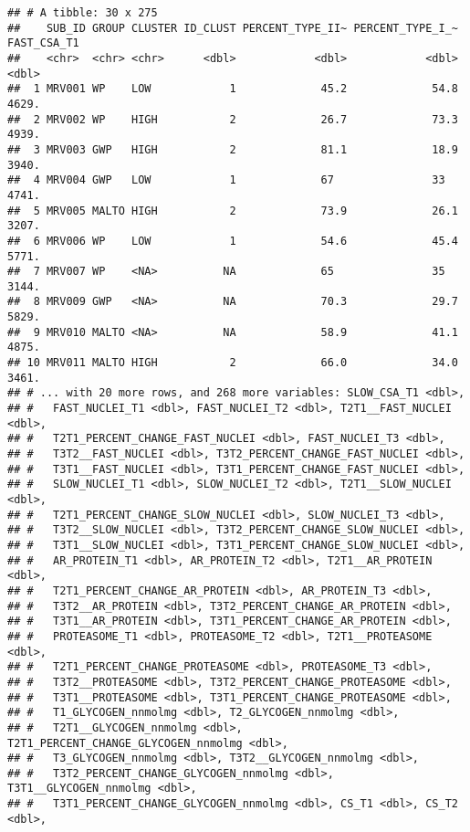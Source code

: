 \documentclass[
]{article}
\begin{document}
\begin{verbatim}
## # A tibble: 30 x 275
##    SUB_ID GROUP CLUSTER ID_CLUST PERCENT_TYPE_II~ PERCENT_TYPE_I_~ FAST_CSA_T1
##    <chr>  <chr> <chr>      <dbl>            <dbl>            <dbl>       <dbl>
##  1 MRV001 WP    LOW            1             45.2             54.8       4629.
##  2 MRV002 WP    HIGH           2             26.7             73.3       4939.
##  3 MRV003 GWP   HIGH           2             81.1             18.9       3940.
##  4 MRV004 GWP   LOW            1             67               33         4741.
##  5 MRV005 MALTO HIGH           2             73.9             26.1       3207.
##  6 MRV006 WP    LOW            1             54.6             45.4       5771.
##  7 MRV007 WP    <NA>          NA             65               35         3144.
##  8 MRV009 GWP   <NA>          NA             70.3             29.7       5829.
##  9 MRV010 MALTO <NA>          NA             58.9             41.1       4875.
## 10 MRV011 MALTO HIGH           2             66.0             34.0       3461.
## # ... with 20 more rows, and 268 more variables: SLOW_CSA_T1 <dbl>,
## #   FAST_NUCLEI_T1 <dbl>, FAST_NUCLEI_T2 <dbl>, T2T1__FAST_NUCLEI <dbl>,
## #   T2T1_PERCENT_CHANGE_FAST_NUCLEI <dbl>, FAST_NUCLEI_T3 <dbl>,
## #   T3T2__FAST_NUCLEI <dbl>, T3T2_PERCENT_CHANGE_FAST_NUCLEI <dbl>,
## #   T3T1__FAST_NUCLEI <dbl>, T3T1_PERCENT_CHANGE_FAST_NUCLEI <dbl>,
## #   SLOW_NUCLEI_T1 <dbl>, SLOW_NUCLEI_T2 <dbl>, T2T1__SLOW_NUCLEI <dbl>,
## #   T2T1_PERCENT_CHANGE_SLOW_NUCLEI <dbl>, SLOW_NUCLEI_T3 <dbl>,
## #   T3T2__SLOW_NUCLEI <dbl>, T3T2_PERCENT_CHANGE_SLOW_NUCLEI <dbl>,
## #   T3T1__SLOW_NUCLEI <dbl>, T3T1_PERCENT_CHANGE_SLOW_NUCLEI <dbl>,
## #   AR_PROTEIN_T1 <dbl>, AR_PROTEIN_T2 <dbl>, T2T1__AR_PROTEIN <dbl>,
## #   T2T1_PERCENT_CHANGE_AR_PROTEIN <dbl>, AR_PROTEIN_T3 <dbl>,
## #   T3T2__AR_PROTEIN <dbl>, T3T2_PERCENT_CHANGE_AR_PROTEIN <dbl>,
## #   T3T1__AR_PROTEIN <dbl>, T3T1_PERCENT_CHANGE_AR_PROTEIN <dbl>,
## #   PROTEASOME_T1 <dbl>, PROTEASOME_T2 <dbl>, T2T1__PROTEASOME <dbl>,
## #   T2T1_PERCENT_CHANGE_PROTEASOME <dbl>, PROTEASOME_T3 <dbl>,
## #   T3T2__PROTEASOME <dbl>, T3T2_PERCENT_CHANGE_PROTEASOME <dbl>,
## #   T3T1__PROTEASOME <dbl>, T3T1_PERCENT_CHANGE_PROTEASOME <dbl>,
## #   T1_GLYCOGEN_nnmolmg <dbl>, T2_GLYCOGEN_nnmolmg <dbl>,
## #   T2T1__GLYCOGEN_nnmolmg <dbl>, T2T1_PERCENT_CHANGE_GLYCOGEN_nnmolmg <dbl>,
## #   T3_GLYCOGEN_nnmolmg <dbl>, T3T2__GLYCOGEN_nnmolmg <dbl>,
## #   T3T2_PERCENT_CHANGE_GLYCOGEN_nnmolmg <dbl>, T3T1__GLYCOGEN_nnmolmg <dbl>,
## #   T3T1_PERCENT_CHANGE_GLYCOGEN_nnmolmg <dbl>, CS_T1 <dbl>, CS_T2 <dbl>,

\end{verbatim}
\end{document}
